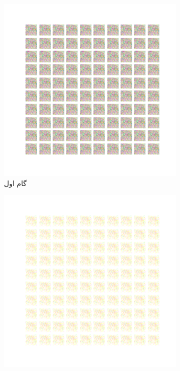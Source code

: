 \documentclass[12pt, a4paper]{book}
\begin{document}
\begin{figure}[h]
    \begin{subfigure}{0.3\linewidth}
        \includegraphics[width=\linewidth]{images/fcgan/noisy_std2.0/generated_img_01.png}
        \caption{گام اول}
    \end{subfigure}
    \begin{subfigure}{0.3\linewidth}
        \includegraphics[width=\linewidth]{images/fcgan/noisy_std2.0/generated_img_15.png}

\end{subfigure}
\end{figure}
\end{document}
